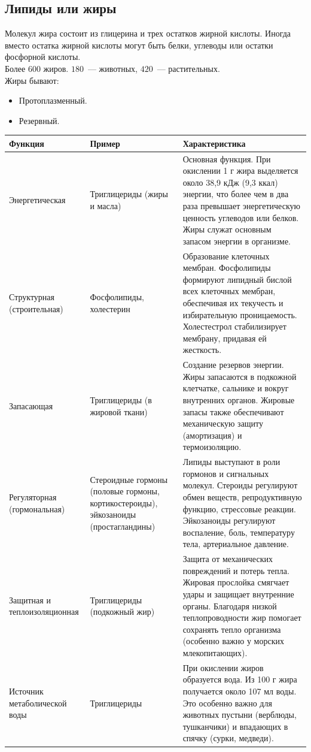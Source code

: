 \documentclass[12pt]{article}
\begin{document}
	\subsection{Липиды или жиры}
	Молекул жира состоит из глицерина и трех остатков жирной кислоты. Иногда вместо остатка жирной кислоты могут быть белки, углеводы или остатки фосфорной кислоты.\\
	Более $600$ жиров. $180$~--- животных, $420$~--- растительных.\\
	Жиры бывают:
	\begin{itemize}
		\item Протоплазменный.
		\item Резервный.
	\end{itemize}
	\begin{xltabular}{\textwidth}{|X|X|X|}
		\hline
		Функция & Пример & Характеристика\\
		\hline
		Энергетическая & Триглицериды (жиры и масла) & Основная функция. При окислении 1 г жира выделяется около 38,9 кДж (9,3 ккал) энергии, что более чем в два раза превышает энергетическую ценность углеводов или белков. Жиры служат основным запасом энергии в организме.\\
		\hline
		Структурная (строительная) & Фосфолипиды, холестерин & Образование клеточных мембран. Фосфолипиды формируют липидный бислой всех клеточных мембран, обеспечивая их текучесть и избирательную проницаемость. Холестестрол стабилизирует мембрану, придавая ей жесткость.\\
		\hline
		Запасающая & Триглицериды (в жировой ткани) & Создание резервов энергии. Жиры запасаются в подкожной клетчатке, сальнике и вокруг внутренних органов. Жировые запасы также обеспечивают механическую защиту (амортизация) и термоизоляцию.\\
		\hline
		Регуляторная (гормональная) & Стероидные гормоны (половые гормоны, кортикостероиды), эйкозаноиды (простагландины) & Липиды выступают в роли гормонов и сигнальных молекул. Стероиды регулируют обмен веществ, репродуктивную функцию, стрессовые реакции. Эйкозаноиды регулируют воспаление, боль, температуру тела, артериальное давление.\\
		\hline
		Защитная и теплоизоляционная & Триглицериды (подкожный жир) & Защита от механических повреждений и потерь тепла. Жировая прослойка смягчает удары и защищает внутренние органы. Благодаря низкой теплопроводности жир помогает сохранять тепло организма (особенно важно у морских млекопитающих).\\
		\hline
		Источник метаболической воды & Триглицериды & При окислении жиров образуется вода. Из 100 г жира получается около 107 мл воды. Это особенно важно для животных пустыни (верблюды, тушканчики) и впадающих в спячку (сурки, медведи).\\

\end{xltabular}
\end{document}
